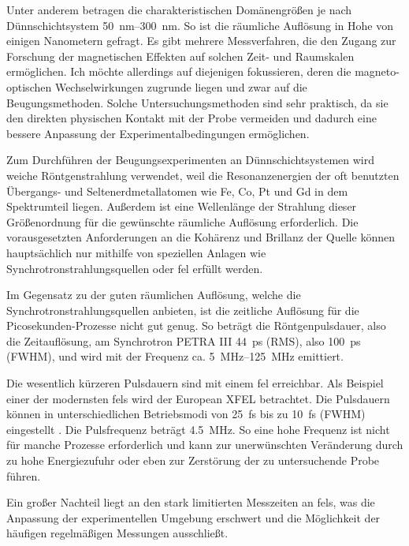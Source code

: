\noindent
Unter anderem betragen die charakteristischen Domänengrößen je nach Dünnschichtsystem \SIrange[range-units = single]{50}{300}{\nano\meter}. So ist die räumliche Auflösung in Hohe von einigen Nanometern gefragt. Es gibt mehrere Messverfahren, die den Zugang zur Forschung der magnetischen Effekten auf solchen Zeit- und Raumskalen ermöglichen. Ich möchte allerdings auf diejenigen fokussieren, deren die magneto-optischen Wechselwirkungen zugrunde liegen und zwar auf die Beugungsmethoden. Solche Untersuchungsmethoden sind sehr praktisch, da sie den direkten physischen Kontakt mit der Probe vermeiden und dadurch eine bessere Anpassung der Experimentalbedingungen ermöglichen.

\noindent
Zum Durchführen der Beugungsexperimenten an Dünnschichtsystemen wird weiche Röntgenstrahlung verwendet, weil die Resonanzenergien der oft benutzten Übergangs- und Seltenerdmetallatomen wie Fe, Co, Pt und Gd in dem Spektrumteil liegen. Außerdem ist eine Wellenlänge der Strahlung dieser Größenordnung für die gewünschte räumliche Auflösung erforderlich. Die vorausgesetzten Anforderungen an die Kohärenz und Brillanz der Quelle können hauptsächlich nur mithilfe von speziellen Anlagen wie Synchrotronstrahlungsquellen oder \gls{fel} erfüllt werden.  %

\noindent
Im Gegensatz zu der guten räumlichen Auflösung, welche die Synchrotronstrahlungsquellen anbieten, ist die zeitliche Auflösung für die Picosekunden-Prozesse nicht gut genug. So beträgt die Röntgenpulsdauer, also die Zeitauflösung, am Synchrotron PETRA III \SI{44}{\pico\second} (RMS), also \SI{100}{\pico\second} (FWHM), und wird mit der Frequenz ca. \SIrange[range-units = single]{5}{125}{\mega\hertz} \cite{noauthor_machine_nodate} emittiert.

\noindent
Die wesentlich kürzeren Pulsdauern sind mit einem \gls{fel} erreichbar. Als Beispiel einer der modernsten \gls{fel}s wird der European XFEL betrachtet. Die Pulsdauern können in unterschiedlichen Betriebsmodi von \SI{25}{\femto\second} bis zu \SI{10}{\femto\second} (FWHM) eingestellt \cite{tschentscher_photon_2017}. Die Pulsfrequenz beträgt \SI{4,5}{\mega\hertz}. So eine hohe Frequenz ist nicht für manche Prozesse erforderlich und kann zur unerwünschten Veränderung durch zu hohe Energiezufuhr oder eben zur Zerstörung der zu untersuchende Probe führen. 

\noindent
Ein großer Nachteil liegt an den stark limitierten Messzeiten an \gls{fel}s, was die Anpassung der experimentellen Umgebung erschwert und die Möglichkeit der häufigen regelmäßigen Messungen ausschließt.

